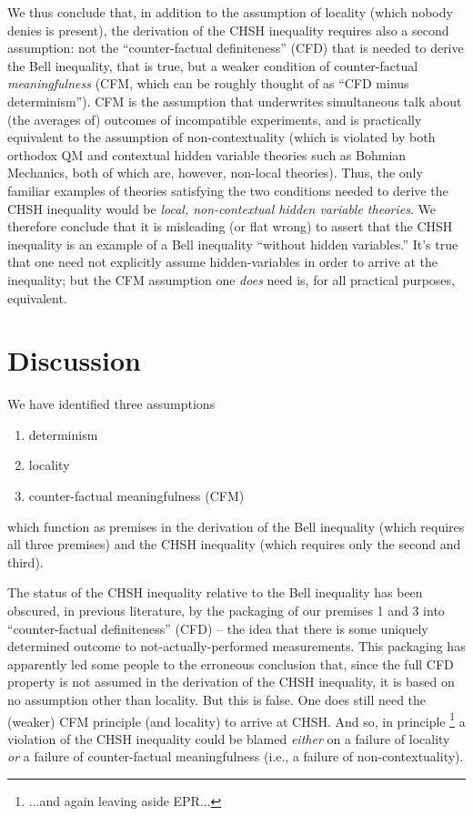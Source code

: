 \documentclass[aps,prc,twocolumn]{revtex4}
\begin{document}
We thus conclude that, in addition to the assumption of locality
(which nobody denies is present), the derivation of the CHSH inequality
requires also a second assumption:  not the ``counter-factual
definiteness'' (CFD) that is needed to derive the Bell inequality, that is
true, but a weaker condition of counter-factual \emph{meaningfulness}
(CFM, which can be roughly thought of as ``CFD minus determinism'').
CFM is the assumption that underwrites simultaneous talk about (the
averages of) outcomes of incompatible experiments, and is practically
equivalent to the assumption of non-contextuality (which is violated
by both orthodox QM and contextual hidden variable theories such
as Bohmian Mechanics, both of which are, however, non-local theories).  
Thus, the only familiar examples of theories satisfying the two
conditions needed to derive the CHSH inequality would be \emph{local,
non-contextual hidden variable theories}.  We therefore conclude that
it is misleading (or flat wrong) to assert that the CHSH inequality is
an example of a Bell inequality ``without hidden
variables.'' \cite{eberhard}   It's true that one need not explicitly assume
hidden-variables in order to arrive at the inequality; but the CFM
assumption one \emph{does} need is, for all practical purposes,
equivalent.  



\section{Discussion}

We have identified three assumptions 
\begin{enumerate}
\item determinism
\item locality
\item counter-factual meaningfulness (CFM)
\end{enumerate}
which function as premises in the derivation of the Bell inequality
(which requires all three premises) and the CHSH inequality (which
requires only the second and third).  

The status of the CHSH inequality relative to the Bell inequality has
been obscured, in previous literature, by the packaging of our
premises 1 and 3 into ``counter-factual definiteness'' (CFD) -- the
idea that there is some uniquely determined outcome to
not-actually-performed measurements.  This packaging has apparently
led some people to the erroneous conclusion that, since the full CFD
property is not assumed in the derivation of the CHSH inequality, it
is based on no assumption other than locality.  But this is false.
One does still need the (weaker) CFM principle (and locality) to
arrive at CHSH.  And so, in principle \footnote{...and again leaving
  aside EPR...} a violation of the CHSH inequality could be blamed
\emph{either} on a failure of locality \emph{or} a failure of
counter-factual meaningfulness (i.e., a failure of non-contextuality).  
\end{document}
